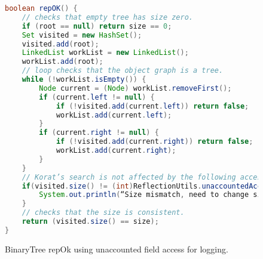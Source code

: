 \begin{figure}
\centering
\begin{lstlisting}[language=Java]
boolean repOK() {
    // checks that empty tree has size zero.
    if (root == null) return size == 0;
    Set visited = new HashSet();
    visited.add(root);
    LinkedList workList = new LinkedList();
    workList.add(root);
    // loop checks that the object graph is a tree.
    while (!workList.isEmpty()) {
        Node current = (Node) workList.removeFirst();
        if (current.left != null) {
            if (!visited.add(current.left)) return false;
            workList.add(current.left);
        }
        if (current.right != null) {
            if (!visited.add(current.right)) return false;
            workList.add(current.right);
        }
    }
    // Korat’s search is not affected by the following access.
    if(visited.size() != (int)ReflectionUtils.unaccountedAccess(this,”size”)){
        System.out.println(“Size mismatch, need to change size”);
    }
    // checks that the size is consistent.
    return (visited.size() == size);
}
\end{lstlisting}
\caption{BinaryTree repOk using unaccounted field access for logging.}
\label{fig:bTreeUnaccountedFieldAccess}
\end{figure}
